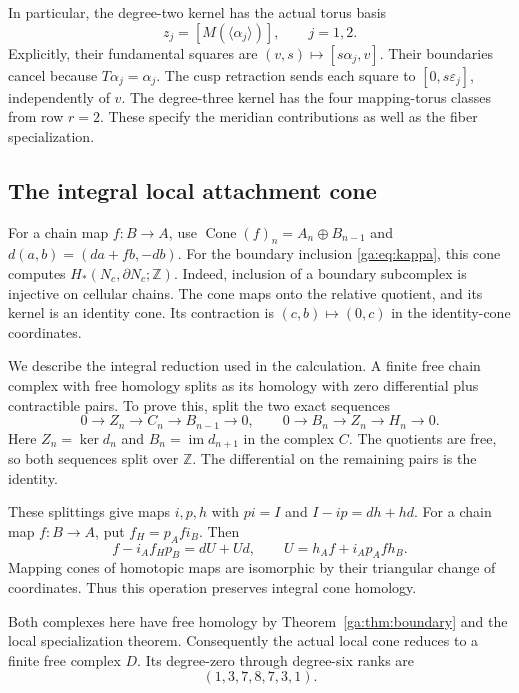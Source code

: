 In particular, the degree-two kernel has the actual torus basis
\begin{equation}\label{ga:eq:kernel2}
z_j=[M(\langle\alpha_j\rangle)],\qquad j=1,2.
\end{equation}
Explicitly, their fundamental squares are $(v,s)\mapsto[s\alpha_j,v]$.
Their boundaries cancel because $T\alpha_j=\alpha_j$.
The cusp retraction sends each square to $[0,s\varepsilon_j]$, independently of $v$.
The degree-three kernel has the four mapping-torus classes from row $r=2$.
These specify the meridian contributions as well as the fiber specialization.

\subsection{The integral local attachment cone}

For a chain map $f:B\to A$, use
$\operatorname{Cone}(f)_n=A_n\oplus B_{n-1}$ and
$d(a,b)=(da+fb,-db)$.
For the boundary inclusion \eqref{ga:eq:kappa}, this cone computes
$H_*(N_c,\partial N_c;\mathbb Z)$.
Indeed, inclusion of a boundary subcomplex is injective on cellular chains.
The cone maps onto the relative quotient, and its kernel is an identity cone.
Its contraction is $(c,b)\mapsto(0,c)$ in the identity-cone coordinates.

We describe the integral reduction used in the calculation.
A finite free chain complex with free homology splits as its homology
with zero differential plus contractible pairs.
To prove this, split the two exact sequences
\[
0\to Z_n\to C_n\to B_{n-1}\to0,
\qquad 0\to B_n\to Z_n\to H_n\to0.
\]
Here $Z_n=\ker d_n$ and $B_n=\operatorname{im}d_{n+1}$ in the complex $C$.
The quotients are free, so both sequences split over $\mathbb Z$.
The differential on the remaining pairs is the identity.

These splittings give maps $i,p,h$ with $pi=I$ and $I-ip=dh+hd$.
For a chain map $f:B\to A$, put $f_H=p_Afi_B$.
Then
\[
f-i_Af_Hp_B=dU+Ud,\qquad U=h_Af+i_Ap_Afh_B.
\]
Mapping cones of homotopic maps are isomorphic by their triangular
change of coordinates. Thus this operation preserves integral cone homology.

Both complexes here have free homology by Theorem~\ref{ga:thm:boundary}
and the local specialization theorem.
Consequently the actual local cone reduces to a finite free complex $D$.
Its degree-zero through degree-six ranks are
\begin{equation}\label{ga:eq:ranks}
(1,3,7,8,7,3,1).
\end{equation}

